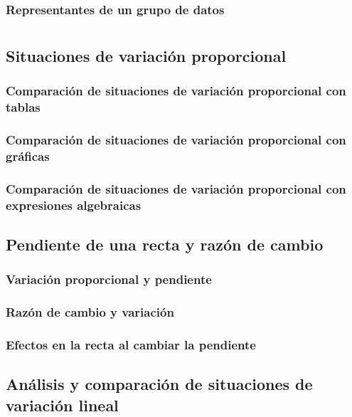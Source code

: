 \documentclass[11pt]{book}
\begin{document}
\subsection{Representantes de un grupo de datos}

\chapter{}

\section{Situaciones de variación proporcional}
\subsection{Comparación de situaciones de variación proporcional con tablas}
\subsection{Comparación de situaciones de variación proporcional con gráficas}
\subsection{Comparación de situaciones de variación proporcional con expresiones algebraicas}




\newpage \thispagestyle{plain}
\section{Pendiente de una recta y razón de cambio}
\subsection{Variación proporcional y pendiente}
\subsection{Razón de cambio y variación}
\subsection{Efectos en la recta al cambiar la pendiente}

\newpage \thispagestyle{plain}
\section{Análisis y comparación de situaciones de variación lineal}
\end{document}
